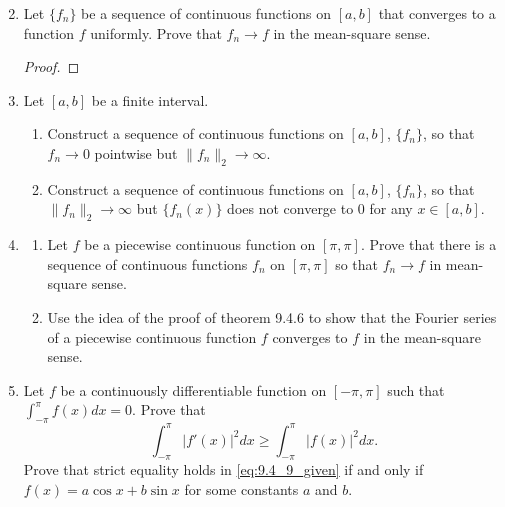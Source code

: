 \documentclass{article}
\begin{document}
\begin{enumerate}
      \setcounter{enumi}{1}
      \item Let $\{f_n\}$ be a sequence of continuous functions on $[a,b]$ that
            converges to a function $f$ uniformly. Prove that $f_n\to f$ in the
            mean-square sense.
            \begin{proof}

            \end{proof}
      \item Let $[a,b]$ be a finite interval.
            \begin{enumerate}
                  \item Construct a sequence of continuous functions on $[a,b]$,
                        $\{f_n\}$, so that $f_n\to 0$ pointwise but
                        $\lVert f_n\rVert_2\to\infty$.
                  \item Construct a sequence of continuous functions on $[a,b]$,
                        $\{f_n\}$, so that $\lVert f_n\rVert_2\to\infty$ but
                        $\{f_n(x)\}$ does not converge to 0 for any $x\in[a,b]$.
            \end{enumerate}
            \setcounter{enumi}{5}
      \item \begin{enumerate}
                  \item Let $f$ be a piecewise continuous function on $[\pi,\pi]$.
                        Prove that there is a sequence of continuous functions
                        $f_n$ on $[\pi,\pi]$ so that $f_n\to f$ in mean-square sense.
                  \item Use the idea of the proof of theorem 9.4.6 to show that
                        the Fourier series of a piecewise continuous function $f$
                        converges to $f$ in the mean-square sense.
            \end{enumerate}
            \setcounter{enumi}{8}
      \item Let $f$ be a continuously differentiable function on $[-\pi,\pi]$
            such that \\$\int_{-\pi}^\pi f(x)dx=0$. Prove that
                  \begin{equation}
                        \int_{-\pi}^\pi \lvert f'(x)\rvert^2dx
                        \geq \int_{-\pi}^\pi \lvert f(x)\rvert^2dx.
                        \label{eq:9.4_9_given}
                  \end{equation}
                  Prove that strict equality holds in \eqref{eq:9.4_9_given} if and
                  only if $f(x)=a\cos x+b\sin x$ for some constants $a$ and $b$.
\end{enumerate}
\end{document}
